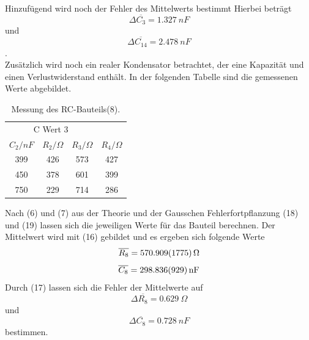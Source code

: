 Hinzufügend wird noch der Fehler des Mittelwerts bestimmt
Hierbei beträgt \\
\begin{equation*}
    \Delta \overline{C_\text{3}} = \SI{1,327}{nF}
\end{equation*}
und
\begin{equation*}
    \Delta \overline{C_\text{14}} = \SI{2,478}{nF}
\end{equation*}.\\
Zusätzlich wird noch ein realer Kondensator betrachtet, der eine Kapazität und einen Verlustwiderstand enthält.
In der folgenden Tabelle sind die gemessenen Werte abgebildet.
\begin{table}[h!]
    \begin{center}
      \caption{Messung des RC-Bauteils(8).}
      \label{tab:Tabelle 3}
      \begin{tabular}{c|c|c|c} 
        \multicolumn{3}{c}{C Wert 3} \\
        \textbf{$C_2 / nF$ } & \textbf{$R_2 / \Omega$} & \textbf{$R_3 / \Omega$} & \textbf{$R_4 / \Omega$}\\
        \hline
        399 & 426 & 573 & 427\\
        450 & 378 & 601 & 399\\
        750 & 229 & 714 & 286\\
      \end{tabular}
    \end{center}
\end{table}

Nach (6) und (7) aus der Theorie und der Gausschen Fehlerfortpflanzung (18) und (19) lassen sich die jeweiligen Werte für das Bauteil berechnen.
Der Mittelwert wird mit (16) gebildet und es ergeben sich folgende Werte
\begin{equation}
    \overline{R_\text{8}} = \SI{570,909 \pm 1,775}{\Omega} \notag
\end{equation}
\begin{equation}
    \overline{C_\text{8}} = \SI{298,836 \pm 0,929}{nF} \notag
\end{equation}
Durch (17) lassen sich die Fehler der Mittelwerte auf
\begin{equation*}
    \Delta \overline{R_\text{8}} = \SI{0,629}{\Omega}
\end{equation*}
und
\begin{equation*}
    \Delta \overline{C_\text{8}} = \SI{0.728}{nF}
\end{equation*} bestimmen.


